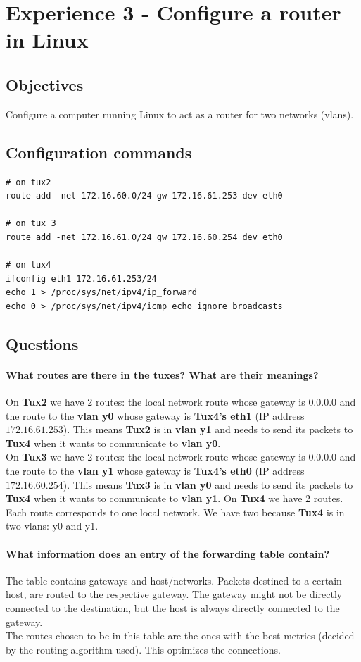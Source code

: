 \documentclass[11pt]{report}
\newcommand{\tux}[1]{\textbf{Tux#1}}
\begin{document}
\section{Experience 3 - Configure a router in Linux}

\subsection{Objectives}
Configure a computer running Linux to act as a router for two networks (vlans).

\subsection{Configuration commands}
\begin{lstlisting}
# on tux2
route add -net 172.16.60.0/24 gw 172.16.61.253 dev eth0

# on tux 3
route add -net 172.16.61.0/24 gw 172.16.60.254 dev eth0

# on tux4
ifconfig eth1 172.16.61.253/24
echo 1 > /proc/sys/net/ipv4/ip_forward
echo 0 > /proc/sys/net/ipv4/icmp_echo_ignore_broadcasts
\end{lstlisting}

\subsection{Questions}
\paragraph{What routes are there in the tuxes? What are their meanings?}
On \tux{2} we have 2 routes: the local network route whose gateway is
$0.0.0.0$ and the route to the \textbf{vlan y0} whose gateway is
\textbf{Tux4's eth1} (IP address $172.16.61.253$). This means \tux{2}
is in \textbf{vlan y1} and needs to send its packets to \tux{4}
when it wants to communicate to \textbf{vlan y0}.\\
On \tux{3} we have 2 routes: the local network route whose gateway is
$0.0.0.0$ and the route to the \textbf{vlan y1} whose gateway is
\textbf{Tux4's eth0} (IP address $172.16.60.254$). This means \tux{3}
is in \textbf{vlan y0} and needs to send its packets to \tux{4}
when it wants to communicate to \textbf{vlan y1}.
On \tux{4} we have 2 routes. Each route corresponds to one local network.
We have two because \tux{4} is in two vlans: y0 and y1.

\paragraph{What information does an entry of the forwarding table contain?}
The table contains gateways and host/networks. Packets destined to a certain host,
are routed to the respective gateway. The gateway might not be directly connected
to the destination, but the host is always directly connected to the gateway.\\
The routes chosen to be in this table are the ones with the best metrics (decided
by the routing algorithm used). This optimizes the connections.
\end{document}
